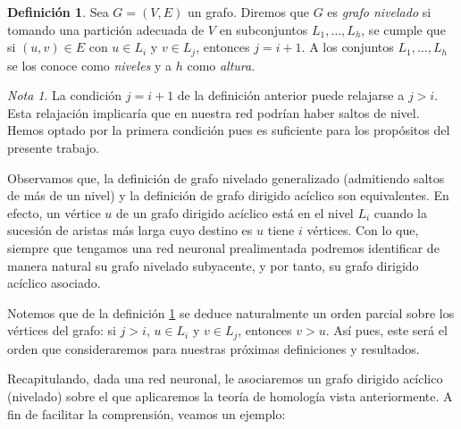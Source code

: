 \documentclass[12pt, a4paper, twoside]{book}
\numberwithin{equation}{section}
\theoremstyle{definition}
\newtheorem{defi}{Definición}[section]
\theoremstyle{remark}
\newtheorem*{remark}{Nota}
\theoremstyle{plain}
\begin{document}
	\begin{defi}
		\label{def:gNivelado}
		Sea $G=(V, E)$ un grafo. Diremos que $G$ es 
		\textit{grafo nivelado} si tomando una partición adecuada de 
		$V$ en 
		subconjuntos $L_{1},\dots,L_{h}$, se cumple que si $(u,v) \in 
		E$ con $u \in L_{i}$ y $v \in L_{j}$, entonces $j=i+1$. A los 
		conjuntos $L_{1},\dots,L_{h}$ se los conoce como 
		\textit{niveles} y a $h$ como \textit{altura}.
	\end{defi}

	\begin{remark}
		La condición $j=i+1$ de la definición anterior puede relajarse
		a $j>i$. Esta relajación implicaría que en nuestra red podrían
		haber saltos de nivel. Hemos optado por la primera condición 
		pues es suficiente para los propósitos del presente trabajo.
	\end{remark}

	Observamos que, la definición de 
	grafo nivelado generalizado (admitiendo saltos de más de un nivel) y 
	la definición de grafo dirigido acíclico son 
	equivalentes. En efecto, un vértice $u$ de un grafo dirigido acíclico 
	está en el nivel $L_{i}$ cuando la sucesión de aristas más larga cuyo 
	destino es $u$ tiene $i$ vértices. Con lo que, siempre que tengamos 
	una red neuronal 
	prealimentada podremos identificar de manera natural su grafo nivelado
	subyacente, y por tanto, su grafo dirigido acíclico asociado. 

	Notemos que de la definición \ref{def:gNivelado} se deduce 
	naturalmente un orden parcial sobre los vértices del grafo: si $j>i$, 
	$u \in L_{i}$ y $v \in L_{j}$, entonces $v>u$. Así pues, este será el 
	orden que consideraremos para nuestras próximas definiciones y 
	resultados.

	Recapitulando, dada una red neuronal, le asociaremos un grafo dirigido
	acíclico (nivelado) sobre el que aplicaremos la teoría de homología 
	vista anteriormente. A fin de facilitar la comprensión, veamos un 
	ejemplo:
\end{document}
